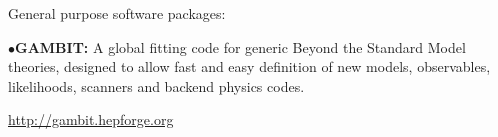 \medskip




General purpose software packages:



\item{$\bullet$}{\bf GAMBIT:}
A global fitting code for generic Beyond the Standard Model theories, designed to allow fast and easy definition of new models, observables, likelihoods, scanners and backend physics codes.
	\item{}\qquad\url{http://gambit.hepforge.org}






